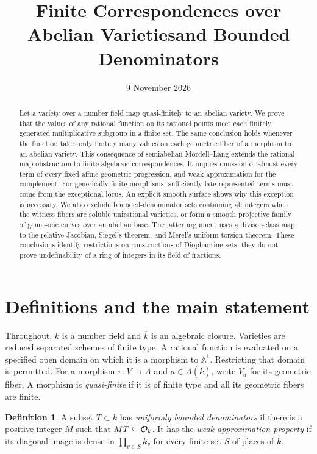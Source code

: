\documentclass[11pt,a4paper]{article}
\title{Finite Correspondences over Abelian Varieties\newline and Bounded Denominators}
\author{}\date{9 November 2026}
\theoremstyle{definition}
\newtheorem{definition}[theorem]{Definition}
\newcommand{\A}{\mathbb A}\newcommand{\PP}{\mathbb P}
\begin{document}
\maketitle
\begin{abstract}
Let a variety over a number field map quasi-finitely to an abelian
variety. We prove that the values of any rational function on its
rational points meet each finitely generated multiplicative subgroup
in a finite set. The same conclusion holds whenever the function
takes only finitely many values on each geometric fiber of a morphism
to an abelian variety. This consequence of semiabelian Mordell--Lang
extends the rational-map obstruction to finite algebraic
correspondences. It implies omission of almost every term of every
fixed affine geometric progression, and weak approximation for the
complement. For generically finite morphisms, sufficiently late
represented terms must come from the exceptional locus. An explicit
smooth surface shows why this exception is necessary. We also exclude
bounded-denominator sets containing all integers when the witness
fibers are soluble unirational varieties, or form a smooth projective
family of genus-one curves over an abelian base. The latter argument
uses a divisor-class map to the relative Jacobian, Siegel's theorem, and
Merel's uniform torsion theorem. These conclusions identify restrictions
on constructions of Diophantine sets; they do not prove undefinability
of a ring of integers in its field of fractions.
\end{abstract}

\section{Definitions and the main statement}

Throughout, $k$ is a number field and $\overline k$ is an algebraic
closure. Varieties are reduced separated schemes of finite type.
A rational function is evaluated on a specified open domain on which
it is a morphism to $\A^1$. Restricting that domain is permitted.
For a morphism $\pi:V\to A$ and $a\in A(\overline k)$, write
$V_a$ for its geometric fiber. A morphism is \emph{quasi-finite}
if it is of finite type and all its geometric fibers are finite.

\begin{definition}
A subset $T\subset k$ has \emph{uniformly bounded denominators}
if there is a positive integer $M$ such that $MT\subseteq\mathcal O_k$.
It has the \emph{weak-approximation property} if its diagonal image
is dense in $\prod_{v\in S}k_v$ for every finite set $S$ of places
of $k$.
\end{definition}
\end{document}
